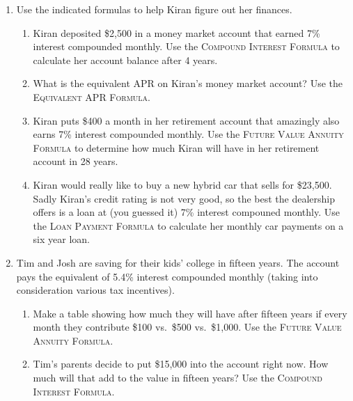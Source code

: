 \begin{enumerate}
\item Use the indicated formulas to help Kiran figure out her finances.
\begin{enumerate}
\item Kiran deposited \$2,500 in a money market account that earned 7\% interest compounded monthly.  Use the \textsc{Compound Interest Formula} to calculate her account balance after 4 years. \vfill
\item What is the equivalent APR on Kiran's money market account?  Use the \textsc{Equivalent APR Formula.} \vfill
\item Kiran puts \$400 a month in her retirement account that amazingly also earns 7\% interest compounded monthly.  Use the \textsc{Future Value Annuity Formula} to determine how much Kiran will have in her retirement account in 28 years. \vfill
\item Kiran would really like to buy a new hybrid car that sells for \$23,500.  Sadly Kiran's credit rating is not very good, so the best the dealership offers is a loan at (you guessed it) 7\% interest compouned monthly.  Use the \textsc{Loan Payment Formula} to calculate her monthly car payments on a six year loan. \vfill
\end{enumerate}

\newpage %

\item Tim and Josh are saving for their kids' college in fifteen years. The account pays the equivalent of 5.4\% interest compounded monthly (taking into consideration various tax incentives). 
 \begin{enumerate}
\item Make a table showing how much they will have after fifteen years if every month they contribute  \$100 vs.\ \$500 vs.\ \$1,000. Use the \textsc{Future Value Annuity Formula}. \vfill  \vfill
\item Tim's parents decide to put \$15,000 into the account right now.  How much will that add to the value in fifteen years?  Use the \textsc{Compound Interest Formula}.  \vfill  \vfill
\end{enumerate}


\end{enumerate}
